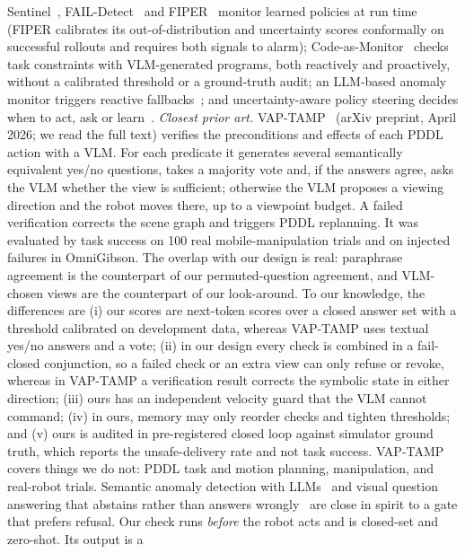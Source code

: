 \documentclass[conference]{IEEEtran}
\begin{document}
Sentinel~\cite{agia2025sentinel}, FAIL-Detect~\cite{xu2025faildetect} and FIPER~\cite{romer2025fiper} monitor learned policies at run time
(FIPER calibrates its out-of-distribution and uncertainty scores conformally on successful rollouts and requires both signals to alarm);
Code-as-Monitor~\cite{zhou2025codeasmonitor} checks task constraints with VLM-generated programs, both reactively and proactively, without a calibrated threshold or a ground-truth audit;
an LLM-based anomaly monitor triggers reactive fallbacks~\cite{sinha2024realtime};
and uncertainty-aware policy steering decides when to act, ask or learn~\cite{yuan2026whentoact}.
\emph{Closest prior art.} VAP-TAMP~\cite{oloo2026vaptamp} (arXiv preprint, April 2026; we read the full text) verifies the preconditions and effects of each PDDL action with a VLM.
For each predicate it generates several semantically equivalent yes/no questions, takes a majority vote and, if the answers agree, asks the VLM whether the view is sufficient;
otherwise the VLM proposes a viewing direction and the robot moves there, up to a viewpoint budget. A failed verification corrects the scene graph and triggers PDDL replanning.
It was evaluated by task success on 100 real mobile-manipulation trials and on injected failures in OmniGibson. The overlap with our design is real: paraphrase agreement
is the counterpart of our permuted-question agreement, and VLM-chosen views are the counterpart of our look-around. To our knowledge, the differences are
(i) our scores are next-token scores over a closed answer set with a threshold calibrated on development data, whereas VAP-TAMP uses textual yes/no answers and a vote;
(ii) in our design every check is combined in a fail-closed conjunction, so a failed check or an extra view can only refuse or revoke, whereas in VAP-TAMP a verification result corrects the symbolic state in either direction;
(iii) ours has an independent velocity guard that the VLM cannot command;
(iv) in ours, memory may only reorder checks and tighten thresholds; and
(v) ours is audited in pre-registered closed loop against simulator ground truth, which reports the unsafe-delivery rate and not task success.
VAP-TAMP covers things we do not: PDDL task and motion planning, manipulation, and real-robot trials.
Semantic anomaly detection with LLMs~\cite{elhafsi2023semantic} and visual question answering that abstains rather than
answers wrongly~\cite{whitehead2022reliablevqa} are close in spirit to a gate that prefers refusal. Our check runs \emph{before} the robot acts and is closed-set and zero-shot. Its output is a
\end{document}
